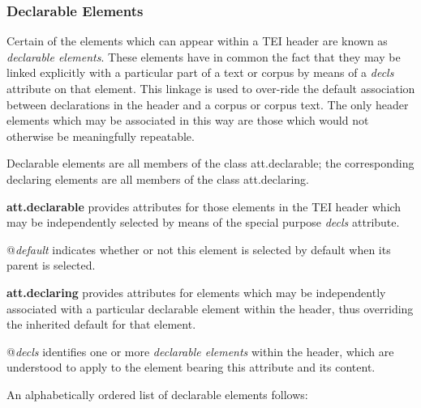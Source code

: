 \subsubsection[{Declarable Elements}]{Declarable Elements}\label{CCAS2}\par
Certain of the elements which can appear within a TEI header are known as \textit{declarable elements}. These elements have in common the fact that they may be linked explicitly with a particular part of a text or corpus by means of a {\itshape decls} attribute on that element. This linkage is used to over-ride the default association between declarations in the header and a corpus or corpus text. The only header elements which may be associated in this way are those which would not otherwise be meaningfully repeatable.\par
Declarable elements are all members of the class \textsf{att.declarable}; the corresponding declaring elements are all members of the class \textsf{att.declaring}. 
\begin{sansreflist}
  
\item [\textbf{att.declarable}] provides attributes for those elements in the TEI header which may be independently selected by means of the special purpose {\itshape decls} attribute.\hfil\\[-10pt]\begin{sansreflist}
    \item[@{\itshape default}]
  indicates whether or not this element is selected by default when its parent is selected.
\end{sansreflist}  
\item [\textbf{att.declaring}] provides attributes for elements which may be independently associated with a particular declarable element within the header, thus overriding the inherited default for that element.\hfil\\[-10pt]\begin{sansreflist}
    \item[@{\itshape decls}]
  identifies one or more \textit{declarable elements} within the header, which are understood to apply to the element bearing this attribute and its content.
\end{sansreflist}  
\end{sansreflist}
\par
An alphabetically ordered list of declarable elements follows: 
